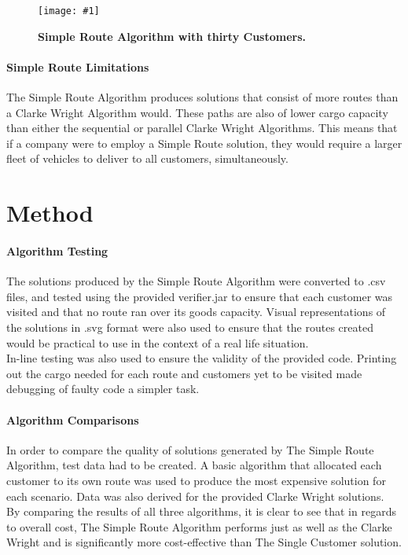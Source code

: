 \documentclass[conference]{acmsiggraph}
\newcommand{\figuremacroW}[4]{
	\begin{figure}[h] %
		\centering
		\texttt{[image: \#1]}
		\caption[#2]{\textbf{#2}  #3}
		\label{fig:#1}
	\end{figure}
}
\begin{document}
		\figuremacroW
		{sr30}
		{Simple Route Algorithm with thirty Customers.}
		{}
		{0.75}	
		
		\paragraph{Simple Route Limitations}
		The Simple Route Algorithm produces solutions that consist of more routes than a Clarke Wright Algorithm would. These paths are also of lower cargo capacity than either the sequential or parallel Clarke Wright Algorithms. This means that if a company were to employ a Simple Route solution, they would require a larger fleet of vehicles to deliver to all customers, simultaneously.
		
	\section{Method}
		\paragraph{Algorithm Testing}
		The solutions produced by the Simple Route Algorithm were converted to .csv files, and tested using the provided verifier.jar to ensure that each customer was visited and that no route ran over its goods capacity. Visual representations of the solutions in .svg format were also used to ensure that the routes created would be practical to use in the context of a real life situation.\\
		In-line testing was also used to ensure the validity of the provided code. Printing out the cargo needed for each route and customers yet to be visited made debugging of faulty code a simpler task. 
	
		\paragraph{Algorithm Comparisons}
		In order to compare the quality of solutions generated by The Simple Route Algorithm, test data had to be created. A basic algorithm that allocated each customer to its own route was used to produce the most expensive solution for each scenario. Data was also derived for the provided Clarke Wright solutions.\\
		By comparing the results of all three algorithms, it is clear to see that in regards to overall cost, The Simple Route Algorithm performs just as well as the Clarke Wright and is significantly more cost-effective than The Single Customer solution.
				
\end{document}
